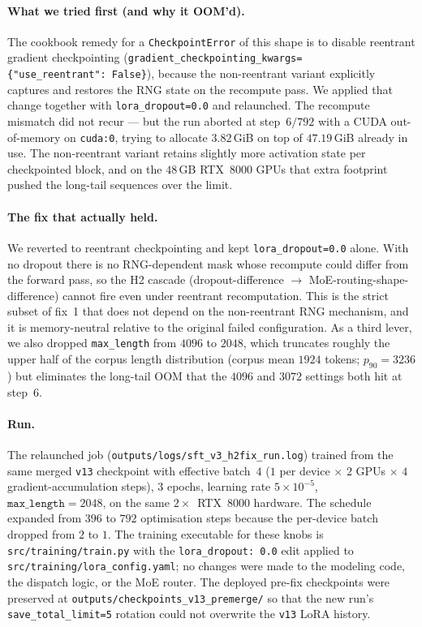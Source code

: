 \documentclass[11pt]{article}
\begin{document}
\paragraph{What we tried first (and why it OOM'd).} The cookbook
remedy for a \texttt{CheckpointError} of this shape is to disable
reentrant gradient checkpointing
(\texttt{gradient\_checkpointing\_kwargs=\{"use\_reentrant":\ False\}}),
because the non-reentrant variant explicitly captures and restores
the RNG state on the recompute pass. We applied that change together
with \texttt{lora\_dropout=0.0} and relaunched. The recompute
mismatch did not recur --- but the run aborted at step~$6/792$ with a
CUDA out-of-memory on \texttt{cuda:0}, trying to allocate
$3.82$\,GiB on top of $47.19$\,GiB already in use. The non-reentrant
variant retains slightly more activation state per checkpointed
block, and on the $48$\,GB RTX~8000 GPUs that extra footprint pushed
the long-tail sequences over the limit.

\paragraph{The fix that actually held.} We reverted to reentrant
checkpointing and kept \texttt{lora\_dropout=0.0} alone. With no
dropout there is no RNG-dependent mask whose recompute could differ
from the forward pass, so the H2 cascade (dropout-difference $\to$
MoE-routing-shape-difference) cannot fire even under reentrant
recomputation. This is the strict subset of fix~1 that does not
depend on the non-reentrant RNG mechanism, and it is memory-neutral
relative to the original failed configuration. As a third lever, we
also dropped \texttt{max\_length} from $4096$ to $2048$, which
truncates roughly the upper half of the corpus length distribution
(corpus mean $1924$ tokens; $p_{90}=3236$) but eliminates the
long-tail OOM that the $4096$ and $3072$ settings both hit at
step~$6$.

\paragraph{Run.} The relaunched job (\texttt{outputs/logs/sft\_v3\_h2fix\_run.log})
trained from the same merged \texttt{v13} checkpoint with effective
batch~$4$ ($1$ per device $\times$ $2$ GPUs $\times$ $4$
gradient-accumulation steps), $3$ epochs, learning rate
$5\!\times\!10^{-5}$, $\texttt{max\_length}=2048$, on the same
$2{\times}$~RTX~8000 hardware. The schedule expanded from $396$ to
$792$ optimisation steps because the per-device batch dropped from
$2$ to $1$. The training executable for these knobs is
\texttt{src/training/train.py} with the \texttt{lora\_dropout: 0.0}
edit applied to \texttt{src/training/lora\_config.yaml}; no changes
were made to the modeling code, the dispatch logic, or the MoE
router. The deployed pre-fix checkpoints were preserved at
\texttt{outputs/checkpoints\_v13\_premerge/} so that the new run's
\texttt{save\_total\_limit=5} rotation could not overwrite the
\texttt{v13} LoRA history.
\end{document}
